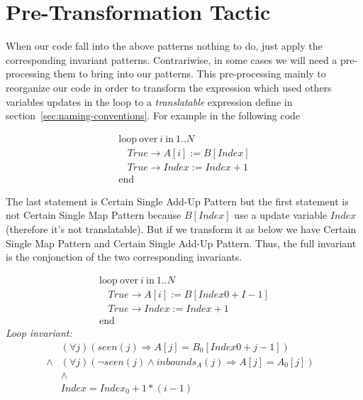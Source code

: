 \documentclass[a4paper,10pt]{article}
\newcommand{\KWloop}{\ensuremath{\mathrm{loop}~}}
\newcommand{\KWend}{\ensuremath{\mathrm{end}~}}
\newcommand{\KWover}{\ensuremath{\mathrm{over}~}}
\newcommand{\KWin}{\ensuremath{~\mathrm{in}~}}
\newcommand{\impl}{\ensuremath{\Longrightarrow}}
\newcommand{\inbounds}[2]{\ensuremath{\mathit{inbounds}_{#1}(#2)}\xspace}
\newcommand{\seen}[1]{\ensuremath{\mathit{seen}(#1)}\xspace}
\newcommand{\loopinvariant}{\noindent\textit{Loop invariant:}\xspace}
\newcommand{\translatable}{translatable}
\begin{document}
\section{Pre-Transformation Tactic}
When our code fall into the above patterns nothing to do, just apply the corresponding invariant patterns. 
Contrariwise, in some cases we will need a pre-processing them to bring into our patterns. 
This pre-processing mainly to reorganize our code in order to transform the expression 
which used others variables updates in the loop to a \textit{\translatable}  expression 
define in section~\ref{sec:naming-conventions}. For example in the following code 

$$\begin{array}{l}
  \KWloop \KWover i \KWin 1 .. N \\
  ~~~~ True \rightarrow A[i] := B[Index]\\
  ~~~~ True \rightarrow Index := Index + 1\\
  \KWend
\end{array}$$

The last statement is Certain Single Add-Up Pattern but the first statement is not Certain Single Map Pattern
because $B[Index]$ use a update variable $Index$ (therefore it's not translatable). But if we transform it as below we have 
Certain Single Map Pattern and Certain Single Add-Up Pattern. Thus, the full invariant is the conjonction of the
two corresponding invariants.

$$\begin{array}{l}
  \KWloop \KWover i \KWin 1 .. N \\
  ~~~~ True \rightarrow A[i]   := B[Index0 + I-1]\\
  ~~~~ True \rightarrow Index := Index + 1\\
  \KWend
\end{array}$$
%
\loopinvariant
%
\begin{eqnarray*}
&(\forall j)(\seen{j} \impl A[j] = B_0[Index0 + j-1]) \\
\land& (\forall j)(\neg \seen{j} \land \inbounds{A}{j} \impl A[j] = A_0[j])\\
&\land& \\
&Index = Index_0 + 1 * (i-1)&
\end{eqnarray*}



\end{document}
